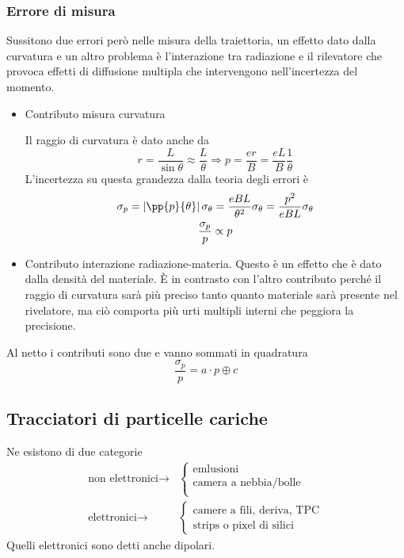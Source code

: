\documentclass[12pt]{book}
\begin{document}
\subsubsection{Errore di misura}
Sussitono due errori però nelle misura della traiettoria, un effetto dato dalla curvatura e un altro problema è l'interazione tra radiazione e il rilevatore che provoca effetti di diffusione multipla che intervengono nell'incertezza del momento.

\begin{itemize}
	\item Contributo misura curvatura

Il raggio di curvatura è dato anche da
\begin{equation}
	r= \frac{L}{\sin \theta} \approx \frac{L}{\theta} \Rightarrow p = \frac{er}{B} = \frac{eL}{B} \frac{1}{\theta}
\end{equation}
L'incertezza su questa grandezza dalla teoria degli errori è
\begin{gather}
	\sigma_p= \left| \pp{p}{\theta} \right| \sigma_\theta = \frac{eBL}{\theta^2} \sigma_\theta = \frac{p^2}{eBL} \sigma_\theta \\
	\frac{\sigma_p}{p} \propto p
\end{gather}
\item Contributo interazione radiazione-materia. Questo è un effetto che è dato dalla densità del materiale. È in contrasto con l'altro contributo perché il raggio di curvatura sarà più preciso tanto quanto materiale sarà presente nel rivelatore, ma ciò comporta più urti multipli interni che peggiora la precisione.  
\end{itemize}
Al netto i contributi sono due e vanno sommati in quadratura
\begin{equation}
	\frac{\sigma_p}{p} = a \cdot p \oplus c
\end{equation}

\subsection{Tracciatori di particelle cariche}
Ne esistono di due categorie
\begin{align*}
	\text{non elettronici} \longrightarrow &\begin{cases}
 	\text{emlusioni}\\
 	\text{camera a nebbia/bolle}\\
 \end{cases}\\
 \text{elettronici} \longrightarrow &\begin{cases}
 	\text{camere a fili, deriva, TPC}\\
 	\text{strips o pixel di silici}
 \end{cases}
\end{align*}
Quelli elettronici sono detti anche dipolari. 
\end{document}
